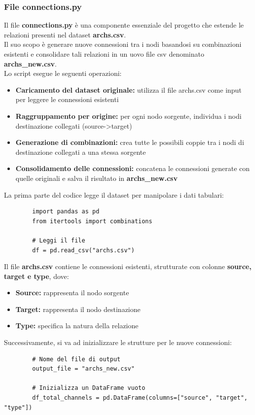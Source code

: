 \documentclass[12pt]{article}
\begin{document}
	\subsubsection{File connections.py}
	Il file \textbf{connections.py} è una componente essenziale del progetto che estende le relazioni presenti nel dataset \textbf{archs.csv}.\\
	Il suo scopo è generare nuove connessioni tra i nodi basandosi su combinazioni esistenti e consolidare tali relazioni in un uovo file csv denominato \textbf{archs\_new.csv}.\\
	Lo script esegue le seguenti operazioni:
	\begin{itemize}[label=]
		\item \textbf{Caricamento del dataset originale:} utilizza il file archs.csv come input per leggere le connessioni esistenti
		\item \textbf{Raggruppamento per origine:} per ogni nodo sorgente, individua i nodi destinazione collegati (source->target)
		\item \textbf{Generazione di combinazioni:} crea tutte le possibili coppie tra i nodi di destinazione collegati a una stessa sorgente
		\item \textbf{Consolidamento delle connessioni:} concatena le connessioni generate con quelle originali e salva il risultato in \textbf{archs\_new.csv}
	\end{itemize}
	La prima parte del codice legge il dataset per manipolare i dati tabulari:
	\begin{lstlisting}
		import pandas as pd
		from itertools import combinations
		
		# Leggi il file
		df = pd.read_csv("archs.csv")
	\end{lstlisting}
	Il file \textbf{archs.csv} contiene le connessioni esistenti, strutturate con colonne \textbf{source, target e type}, dove:
	\begin{itemize}[label=]
		\item \textbf{Source:} rappresenta il nodo sorgente
		\item \textbf{Target:} rappresenta il nodo destinazione
		\item \textbf{Type:} specifica la natura della relazione
	\end{itemize}
	Successivamente, si va ad inizializzare le strutture per le nuove connessioni:
	\begin{lstlisting}
		# Nome del file di output
		output_file = "archs_new.csv"
		
		# Inizializza un DataFrame vuoto
		df_total_channels = pd.DataFrame(columns=["source", "target", "type"])
	\end{lstlisting}
\end{document}
